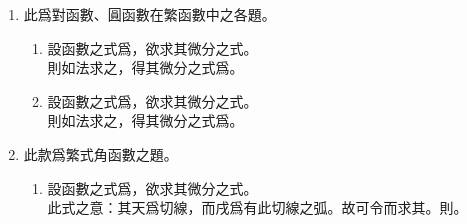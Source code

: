 \begin{enumerate} [label={第\chinese*款},nolistsep]
\begin{enumerate} [label={\chinese*題}]
	如法求之，得其微分之式爲\CJKmove。
	\item 設函數之式爲\CJKmove，欲求其微分之式。\\
	如法求之，得其微分之式爲\CJKmove。
	\end{enumerate}
	\item 此爲對函數、圓函數在繁函數中之各題。
	\begin{enumerate} [label={\chinese*題}]
		\item 設函數之式爲\CJKmove，欲求其微分之式。\\
		則如法求之，得其微分之式爲\CJKmove。
		\item 設函數之式爲\CJKmove，欲求其微分之式。\\
		則如法求之，得其微分之式爲\CJKmove。
	\end{enumerate}
	\item 此款爲繁式角函數之題。
	\begin{enumerate} [label={\chinese*題}]
		\item 設函數之式爲\CJKmove，欲求其微分之式。\\
		此式之意：其天爲切線，而戌爲有此切線之弧。故可令\CJKmove 而求其\CJKmove。則\CJKmove。\\

\end{enumerate}
\end{enumerate}
